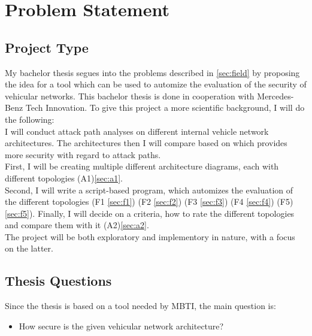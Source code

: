 
\chapter{Problem Statement}
\label{sec:problem}

\section{Project Type}\label{sec:type}

My bachelor thesis segues into the problems described in \ref{sec:field} by proposing the idea for a tool which can be used to automize the evaluation of the security of vehicular networks.
This bachelor thesis is done in cooperation with Mercedes-Benz Tech Innovation.
To give this project a more scientific background, I will do the following: \\

I will conduct attack path analyses on different internal vehicle network architectures.
The architectures then I will compare based on which provides more security with regard to attack paths.\\

First, I will be creating multiple different architecture diagrams, each with different topologies (A1)\ref{sec:a1}.\\
Second, I will write a script-based program, which automizes the evaluation of the different topologies 
(F1 \ref{sec:f1})
(F2 \ref{sec:f2})
(F3 \ref{sec:f3})
(F4 \ref{sec:f4})
(F5)\ref{sec:f5}).
Finally, I will decide on a criteria, how to rate the different topologies and compare them with it (A2)\ref{sec:a2}.\\

The project will be both exploratory and implementory in nature, with a focus on the latter.


\section{Thesis Questions}\label{sec:questions}

Since the thesis is based on a tool needed by MBTI, the main question is:\\

\begin{itemize}
    \item How secure is the given vehicular network architecture?
\end{itemize}

